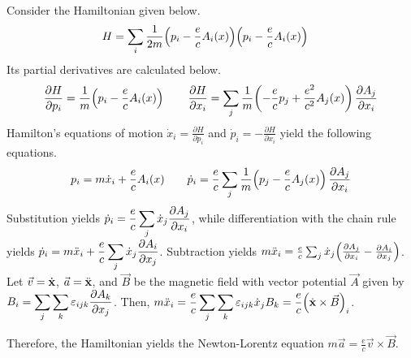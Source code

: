 \begin{answer}
	Consider the Hamiltonian given below.
	\begin{align}
		H & = \sum_i \frac{1}{2m} \!\left(p_i - \frac{e}{c} A_i(x)\right)\!\left(p_i - \frac{e}{c} A_i(x)\right)
	\end{align}
	Its partial derivatives are calculated below.
	\begin{align*}
		\frac{\partial H}{\partial p_i} = \frac{1}{m} \!\left(p_i - \frac{e}{c} A_i(x)\right)
		\qquad
		\frac{\partial H}{\partial x_i} = \sum_{j} \frac{1}{m} \!\left(-\frac{e}{c} p_j + \frac{e^2}{c^2} A_j(x)\right) \frac{\partial A_j}{\partial x_i}
	\end{align*}
	Hamilton's equations of motion $\dot{x}_i = \frac{\partial H}{\partial p_i}$ and $\dot{p}_i = - \frac{\partial H}{\partial x_i}$ yield the following equations.
	\begin{align*}
		p_i = m\dot{x}_i + \frac{e}{c} A_i(x)
		\qquad
		\dot{p}_i = \frac{e}{c} \sum_{j} \frac{1}{m} \!\left(p_j - \frac{e}{c} A_j(x)\right) \frac{\partial A_j}{\partial x_i}
	\end{align*}
	Substitution yields $\displaystyle \dot{p}_i = \frac{e}{c} \sum_j \dot{x}_j \frac{\partial A_j}{\partial x_i}$, while differentiation with the chain rule yields $\displaystyle \dot{p}_i = m \ddot{x}_i + \frac{e}{c} \sum_{j} \dot{x}_j \frac{\partial A_i}{\partial x_j}$.
	Subtraction yields $m \ddot{x}_i = \frac{e}{c} \sum_j \dot{x}_j \!\left(\frac{\partial A_j}{\partial x_i} - \frac{\partial A_i}{\partial x_j}\right)$.
	Let $\vec{v} = \dot{\mathbf{x}}$, $\vec{a} = \ddot{\mathbf{x}}$, and $\vec{B}$ be the magnetic field with vector potential $\vec{A}$ given by $\displaystyle B_i = \sum_j \sum_k \varepsilon_{ijk} \frac{\partial A_k}{\partial x_j}$.
	Then, $\displaystyle m \ddot{x}_i = \frac{e}{c} \sum_j \sum_k \varepsilon_{ijk} \dot{x}_j B_k = \frac{e}{c} \!\left(\dot{\mathbf{x}} \times \vec{B}\right)_i$.

	Therefore, the Hamiltonian yields the Newton-Lorentz equation $m \vec{a} = \frac{e}{c} \vec{v} \times \vec{B}$.
\end{answer}

